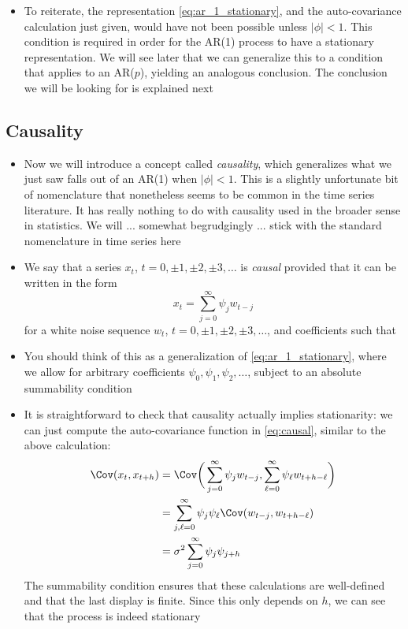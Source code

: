 \documentclass{article}
\begin{document}
\begin{itemize}
\item To reiterate, the representation \eqref{eq:ar_1_stationary}, and the
  auto-covariance calculation just given, would have not been possible unless
  $|\phi| < 1$. This condition is required in order for the AR(1) process to
  have a stationary representation. We will see later that we can generalize
  this to a condition that applies to an AR($p$), yielding an analogous
  conclusion. The conclusion we will be looking for is explained next  
\end{itemize}

\subsection{Causality}

\begin{itemize}
\item Now we will introduce a concept called \emph{causality}, which generalizes
  what we just saw falls out of an AR(1) when $|\phi| < 1$. This is a slightly
  unfortunate bit of nomenclature that nonetheless seems to be common in the
  time series literature. It has really nothing to do with causality used in the
  broader sense in statistics. We will ... somewhat begrudgingly ... stick with
  the standard nomenclature in time series here  

\item We say that a series $x_t$, $t = 0, \pm 1, \pm 2, \pm 3, \dots$ is
  \emph{causal} provided that it can be written in the form
  \begin{equation}
  \label{eq:causal}
  x_t = \sum_{j=0}^\infty \psi_j w_{t-j}
  \end{equation}
  for a white noise sequence $w_t$, $t = 0, \pm 1, \pm 2, \pm 3, \dots$, and
  coefficients such that   

\item You should think of this as a generalization of
  \eqref{eq:ar_1_stationary}, where we allow for arbitrary coefficients
  $\psi_0,\psi_1,\psi_2,\dots$, subject to an absolute summability condition  

\item It is straightforward to check that causality actually implies
  stationarity: we can just compute the auto-covariance function in
  \eqref{eq:causal}, similar to the above calculation:
    \begin{align*}
  \Cov(x_t, x_{t+h}) &= \Cov\bigg( \sum_{j=0}^\infty \psi_j w_{t-j}, 
  \sum_{\ell=0}^\infty \psi_\ell w_{t+h-\ell} \bigg) \\
  &= \sum_{j,\ell=0}^\infty \psi_j \psi_\ell \Cov( w_{t-j}, w_{t+h-\ell} ) \\
  &= \sigma^2 \sum_{j=0}^\infty \psi_j \psi_{j+h}
  \end{align*}
  The summability condition ensures that these calculations are well-defined and
  that the last display is finite. Since this only depends on $h$, we can see
  that the process is indeed stationary


\end{itemize}
\end{document}
